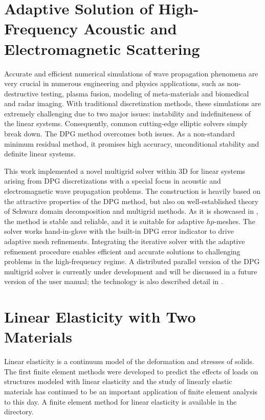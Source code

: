 \section{Adaptive Solution of High-Frequency Acoustic and Electromagnetic Scattering}
\label{sec:adaptive}

Accurate and efficient numerical simulations of wave propagation phenomena are very crucial in numerous engineering and physics applications, such as non-destructive testing, plasma fusion, modeling of meta-materials and biomedical and radar imaging. With traditional discretization methods, these simulations are extremely challenging due to two major issues: instability and indefiniteness of the linear systems. Consequently, common cutting-edge elliptic solvers simply break down. The DPG method overcomes both issues. As a non-standard minimum residual method, it promises high accuracy, unconditional stability and definite linear systems.

This work implemented a novel multigrid solver within \hp3D for linear systems arising from DPG discretizations with a special focus in acoustic and electromagnetic wave propagation problems. The construction is heavily based on the attractive properties of the DPG method, but also on well-established theory of Schwarz domain decomposition and multigrid methods. As it is showcased in \cite{petrides2019phd,petrides2021adaptive,petrides2017adaptive}, the method is stable and reliable, and it is suitable for adaptive $hp$-meshes. The solver works hand-in-glove with the built-in DPG error indicator to drive adaptive mesh refinements. Integrating the iterative solver with the adaptive refinement procedure enables efficient and accurate solutions to challenging problems in the high-frequency regime. A distributed parallel version of the DPG multigrid solver is currently under development and will be discussed in a future version of the user manual; the technology is also described detail in \cite{hpbook3}.

\section{Linear Elasticity with Two Materials}
\label{sec:hose}

Linear elasticity is a continuum model of the deformation and stresses of solids. The first finite element methods were developed to predict the effects of loads on structures modeled with linear elasticity and the study of linearly elastic materials has continued to be an important application of finite element analysis to this day. A finite element method for linear elasticity is available in the  directory.

